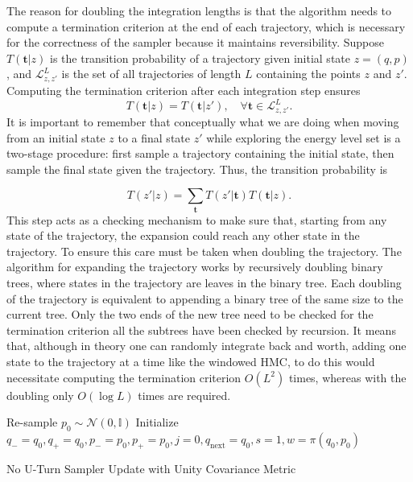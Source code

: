 \documentclass[12pt]{report}
\begin{document}
The reason for doubling the integration lengths is that the algorithm needs to compute a termination criterion at the end of each trajectory, which is necessary for the correctness of the sampler because it maintains reversibility. Suppose $T(\mathbf{t}|z) $ is the transition probability of a trajectory given initial state $z=(q,p)$, and $\mathcal{L}^L_{z,z'}$ is the set of all trajectories of length $L$ containing the points $z$ and $z'$. Computing the termination criterion after each integration step ensures
\[T(\mathbf{t}|z) = T(\mathbf{t}|z'), \quad \forall \mathbf{t} \in \mathcal{L}^L_{z,z'}. \]
It is important to remember that conceptually what we are doing when moving from an initial state $z$ to a final state $z'$ while exploring the energy level set is a two-stage procedure: first sample a trajectory containing the initial state, then sample the final state given the trajectory.  Thus, the transition probability is 

\[T(z'|z) = \sum_{\mathbf{t}} T(z'|\mathbf{t}) T(\mathbf{t}|z). \]
This step acts as a checking mechanism to make sure that, starting from any state of the trajectory, the expansion could reach any other state in the trajectory. To ensure this care must be taken when doubling the trajectory. The algorithm for expanding the trajectory works by recursively doubling binary trees, where states in the trajectory are leaves in the binary tree. Each doubling of the trajectory is equivalent to appending a binary tree of the same size to the current tree. Only the two ends of the new tree need to be checked for the termination criterion all the subtrees have been checked by recursion.
It means that, although in theory one can randomly integrate back and worth, adding one state to the trajectory at a time like the windowed HMC, to do this would necessitate  computing the termination criterion $O(L^2)$ times, whereas with the doubling only $O(\log L)$ times are required. 





\begin{algorithm}
    Re-sample $p_0 \sim \mathcal{N}(0,\mathbb{I})$ \;
    Initialize $q_{-} = q_0 , q_{+} = q_0 , p_{-} =p_0 , p_+ = p_0, j =0 ,	q_{\text{next}} = q_0 , s = 1 , w = \pi(q_0,p_0)$ \;

\caption{No U-Turn Sampler Update with Unity Covariance Metric}
\end{algorithm}
\end{document}
